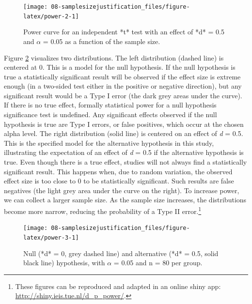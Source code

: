\documentclass[
]{krantz}
\begin{document}
\begin{figure}

{\centering \texttt{[image: 08-samplesizejustification\_files/figure-latex/power-2-1]} 

}

\caption{Power curve for an independent *t* test with an effect of *d* = 0.5 and $\alpha$ = 0.05 as a function of the sample size.}\label{fig:power-2}
\end{figure}

Figure \ref{fig:power-3} visualizes two distributions. The left distribution (dashed line) is centered at 0. This is a model for the null hypothesis. If the null hypothesis is true a statistically significant result will be observed if the effect size is extreme enough (in a two-sided test either in the positive or negative direction), but any significant result would be a Type I error (the dark grey areas under the curve). If there is no true effect, formally statistical power for a null hypothesis significance test is undefined. Any significant effects observed if the null hypothesis is true are Type I errors, or false positives, which occur at the chosen alpha level. The right distribution (solid line) is centered on an effect of \emph{d} = 0.5. This is the specified model for the alternative hypothesis in this study, illustrating the expectation of an effect of \emph{d} = 0.5 if the alternative hypothesis is true. Even though there is a true effect, studies will not always find a statistically significant result. This happens when, due to random variation, the observed effect size is too close to 0 to be statistically significant. Such results are false negatives (the light grey area under the curve on the right). To increase power, we can collect a larger sample size. As the sample size increases, the distributions become more narrow, reducing the probability of a Type II error.\footnote{These figures can be reproduced and adapted in an online shiny app: \url{http://shiny.ieis.tue.nl/d_p_power/}.}

\begin{figure}

{\centering \texttt{[image: 08-samplesizejustification\_files/figure-latex/power-3-1]} 

}

\caption{Null (*d* = 0, grey dashed line) and alternative (*d* = 0.5, solid black line) hypothesis, with $\alpha$ = 0.05 and n = 80 per group.}\label{fig:power-3}
\end{figure}
\end{document}
